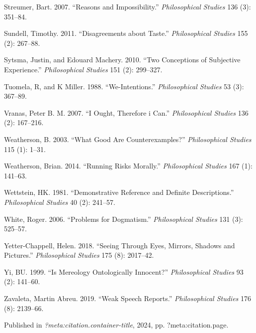 \documentclass[
  10pt,
  letterpaper,
  DIV=11,
  numbers=noendperiod,
  twoside]{scrartcl}
\newlength{\cslhangindent}
\newenvironment{CSLReferences}[2] %
 {\begin{list}{}{%
  \setlength{\itemindent}{0pt}
  \setlength{\leftmargin}{0pt}
  \setlength{\parsep}{0pt}
  \ifodd #1
   \setlength{\leftmargin}{\cslhangindent}
   \setlength{\itemindent}{-1\cslhangindent}
  \fi
  \setlength{\itemsep}{#2\baselineskip}}}
 {\end{list}}
\begin{document}
\begin{CSLReferences}{1}{0}
Streumer, Bart. 2007. {``Reasons and Impossibility.''}
\emph{Philosophical Studies} 136 (3): 351--84.

Sundell, Timothy. 2011. {``Disagreements about Taste.''}
\emph{Philosophical Studies} 155 (2): 267--88.

Sytsma, Justin, and Edouard Machery. 2010. {``Two Conceptions of
Subjective Experience.''} \emph{Philosophical Studies} 151 (2):
299--327.

Tuomela, R, and K Miller. 1988. {``We-Intentions.''} \emph{Philosophical
Studies} 53 (3): 367--89.

Vranas, Peter B. M. 2007. {``I Ought, Therefore i Can.''}
\emph{Philosophical Studies} 136 (2): 167--216.

Weatherson, B. 2003. {``What Good Are Counterexamples?''}
\emph{Philosophical Studies} 115 (1): 1--31.

Weatherson, Brian. 2014. {``Running Risks Morally.''}
\emph{Philosophical Studies} 167 (1): 141--63.

Wettstein, HK. 1981. {``Demonstrative Reference and Definite
Descriptions.''} \emph{Philosophical Studies} 40 (2): 241--57.

White, Roger. 2006. {``Problems for Dogmatism.''} \emph{Philosophical
Studies} 131 (3): 525--57.

Yetter-Chappell, Helen. 2018. {``Seeing Through Eyes, Mirrors, Shadows
and Pictures.''} \emph{Philosophical Studies} 175 (8): 2017--42.

Yi, BU. 1999. {``Is Mereology Ontologically Innocent?''}
\emph{Philosophical Studies} 93 (2): 141--60.

Zavaleta, Martin Abreu. 2019. {``Weak Speech Reports.''}
\emph{Philosophical Studies} 176 (8): 2139--66.

\end{CSLReferences}



\noindent Published in\emph{
?meta:citation.container-title}, 2024, pp. ?meta:citation.page.
\end{document}

